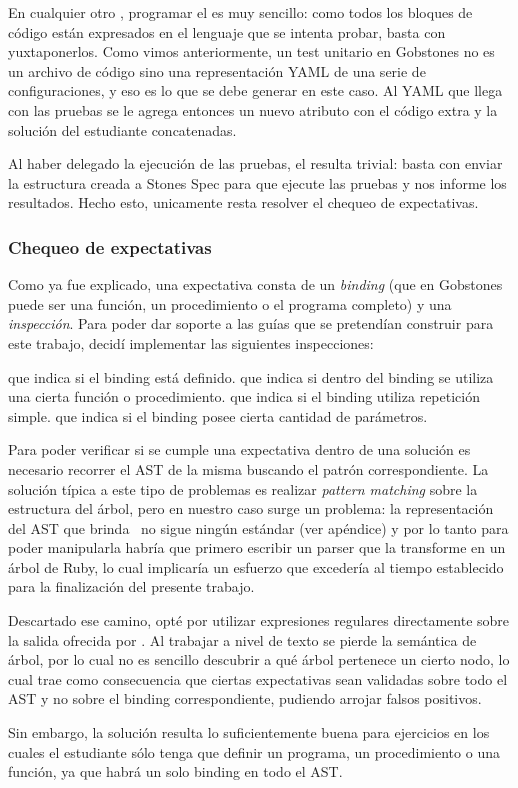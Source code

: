 En cualquier otro \runner, programar el  es muy sencillo: como todos los bloques de código están expresados en el lenguaje que se intenta probar, basta con yuxtaponerlos. Como vimos anteriormente, un test unitario en Gobstones no es un archivo de código sino una representación YAML de una serie de configuraciones, y eso es lo que se debe generar en este caso. Al YAML que llega con las pruebas se le agrega entonces un nuevo atributo  con el código extra y la solución del estudiante concatenadas.

Al haber delegado la ejecución de las pruebas, el  resulta trivial: basta con enviar la estructura creada a Stones Spec para que ejecute las pruebas y nos informe los resultados. Hecho esto, unicamente resta resolver el chequeo de expectativas.

\subsubsection{Chequeo de expectativas}
Como ya fue explicado, una expectativa consta de un \emph{binding} (que en Gobstones puede ser una función, un procedimiento o el programa completo) y una \emph{inspección}. Para poder dar soporte a las guías que se pretendían construir para este trabajo, decidí implementar las siguientes inspecciones:

\begin{itemize}
   que indica si el binding está definido.
   que indica si dentro del binding se utiliza una cierta función o procedimiento.
   que indica si el binding utiliza repetición simple.
   que indica si el binding posee cierta cantidad de parámetros.
\end{itemize}

Para poder verificar si se cumple una expectativa dentro de una solución es necesario recorrer el AST de la misma buscando el patrón correspondiente. La solución típica a este tipo de problemas es realizar \emph{pattern matching} sobre la estructura del árbol, pero en nuestro caso surge un problema: la representación del AST que brinda \pyGob\ no sigue ningún estándar (ver apéndice) y por lo tanto para poder manipularla habría que primero escribir un parser que la transforme en un árbol de Ruby, lo cual implicaría un esfuerzo que excedería al tiempo establecido para la finalización del presente trabajo.

Descartado ese camino, opté por utilizar expresiones regulares directamente sobre la salida ofrecida por \pyGob. Al trabajar a nivel de texto se pierde la semántica de árbol, por lo cual no es sencillo descubrir a qué árbol pertenece un cierto nodo, lo cual trae como consecuencia que ciertas expectativas sean validadas sobre todo el AST y no sobre el binding correspondiente, pudiendo arrojar falsos positivos.

Sin embargo, la solución resulta lo suficientemente buena para ejercicios en los cuales el estudiante sólo tenga que definir un programa, un procedimiento o una función, ya que habrá un solo binding en todo el AST.
